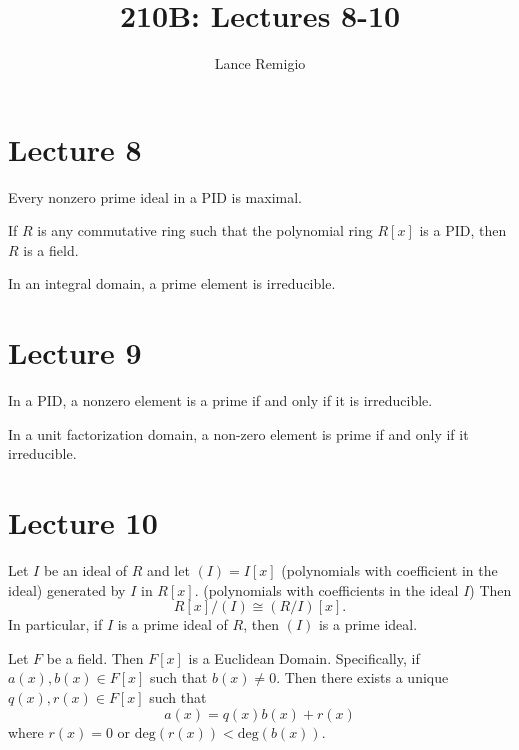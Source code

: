 \documentclass[a4paper]{article}
\title{210B: Lectures 8-10}
\author{Lance Remigio}
\begin{document}
\maketitle

\section*{Lecture 8}

\begin{prop}
    Every nonzero prime ideal in a PID is maximal.
\end{prop}
\vspace{5in}
\newpage
\begin{prop}
    If \( R  \) is any commutative ring such that the polynomial ring \( R[x]  \) is a PID, then \( R \) is a field.
\end{prop}
\newpage
\vspace{5in}
\begin{prop}
   In an integral domain, a prime element is irreducible.   
\end{prop}
\vspace{5in}
\newpage
\section*{Lecture 9}
\begin{prop}
   In a PID, a nonzero element is a prime if and only if it is irreducible. 
\end{prop}
\vspace{5in}
\newpage
\begin{prop}
   In a unit factorization domain, a non-zero element is prime if and only if it irreducible. 
\end{prop}

\vspace{5in}
\newpage
\section*{Lecture 10}
\begin{prop}
    Let \( I  \) be an ideal of \( R  \) and let \( (I) = I[x] \) (polynomials with coefficient in the ideal) generated by \( I  \) in \( R[x] \). (polynomials with coefficients in the ideal \( I \)) Then 
    \[  R[x] / (I) \cong (R /I ) [x]. \]
    In particular, if \( I  \) is a prime ideal of \( R  \), then \( (I) \) is a prime ideal.
\end{prop} 
\vspace{5in}
\newpage
\begin{theorem}[ ]
    Let \( F  \) be a field. Then \( F[x] \) is a Euclidean Domain. Specifically, if \( a(x), b(x) \in F[x] \) such that \( b(x) \neq 0  \). Then there exists a unique \( q(x), r(x) \in F[x] \) such that  
    \[  a(x) = q(x) b(x) + r(x) \]
    where \( r(x) = 0  \) or \( \text{deg}(r(x)) < \text{deg}(b(x))    \).
\end{theorem}
\vspace{5in}


\vspace{5in}
\end{document}
